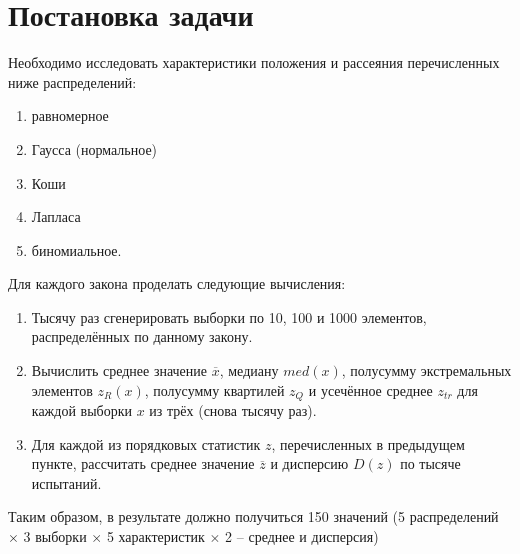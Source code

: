 \documentclass[report1.tex]{subfiles}
\begin{document}
\section{Постановка задачи}
Необходимо исследовать характеристики положения и рассеяния перечисленных ниже распределений:
\begin{enumerate}
	\item равномерное
	\item Гаусса (нормальное)
	\item Коши
	\item Лапласа
	\item биномиальное.
\end{enumerate}
Для каждого закона проделать следующие вычисления:
\begin{enumerate}
	\item Тысячу раз сгенерировать выборки по 10, 100 и 1000 элементов, распределённых по данному закону.
	\item Вычислить среднее значение $\overline{x}$, медиану $med(x)$, полусумму экстремальных элементов $z_R(x)$, полусумму квартилей $z_Q$ и усечённое среднее $z_{tr}$ для каждой выборки $x$ из трёх (снова тысячу раз).
	\item Для каждой из порядковых статистик $z$, перечисленных в предыдущем пункте, рассчитать среднее значение $\overline{z}$ и дисперсию $D(z)$ по тысяче испытаний.
\end{enumerate}
Таким образом, в результате должно получиться 150 значений (5 распределений $\times$ 3 выборки $\times$ 5 характеристик $\times$ 2 -- среднее и дисперсия)
\newpage
\end{document}
